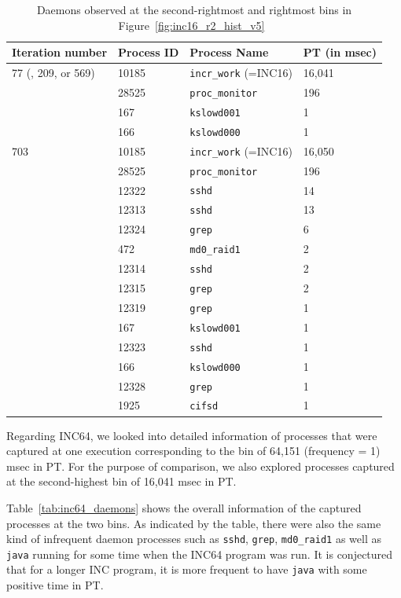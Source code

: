 \begin{table}[h]
\begin{center}
\begin{tabular}{|l|l|l|l|} \hline
Iteration number &  Process ID & Process Name  & PT (in msec)\\ \hline
77 (, 209, or 569) & 10185 & {\tt incr\_work} (=INC16) & 16,041 \\ \hline
& 28525 & {\tt proc\_monitor} & 196 \\ \hline
& 167 & {\tt kslowd001} &  1 \\ \hline
& 166 & {\tt kslowd000} &  1 \\ \hline \hline 
703 & 10185 & {\tt incr\_work} (=INC16) & 16,050 \\ \hline
& 28525 & {\tt proc\_monitor} & 196 \\ \hline
& 12322 & {\tt sshd} & 14 \\ \hline
& 12313 & {\tt sshd}  & 13 \\ \hline
& 12324 & {\tt grep}  &  6 \\ \hline
& 472 & {\tt md0\_raid1} &  2 \\ \hline
& 12314 & {\tt sshd}  &  2 \\ \hline
& 12315 & {\tt grep}  &  2 \\ \hline
& 12319 & {\tt grep}  &  1 \\ \hline
& 167 & {\tt kslowd001} &  1 \\ \hline
& 12323 & {\tt sshd}  &  1 \\ \hline
& 166 & {\tt kslowd000} &  1 \\ \hline
& 12328 & {\tt grep}  &  1 \\ \hline
& 1925 & {\tt cifsd} &  1 \\ \hline 
\hline
\end{tabular}
\end{center}
\caption{Daemons observed at the second-rightmost and rightmost bins in Figure~\ref{fig:inc16_r2_hist_v5}~\label{tab:inc16_daemons}}
\end{table}

Regarding INC64, we looked into detailed information of processes that were 
captured at one execution corresponding to the bin of 64,151 (frequency = 1) msec in PT. 
For the purpose of comparison, we also explored processes captured 
at the second-highest bin of 16,041 msec in PT. 

Table~\ref{tab:inc64_daemons} shows the overall information of the captured processes at the two bins. 
As indicated by the table, there were also 
the same kind of infrequent daemon processes such as {\tt sshd}, {\tt grep}, {\tt md0\_raid1} as well as 
{\tt java} running for some time when the INC64 program was run. 
It is conjectured that for a longer INC program, it is more frequent to have {\tt java} with some positive time in PT. 


